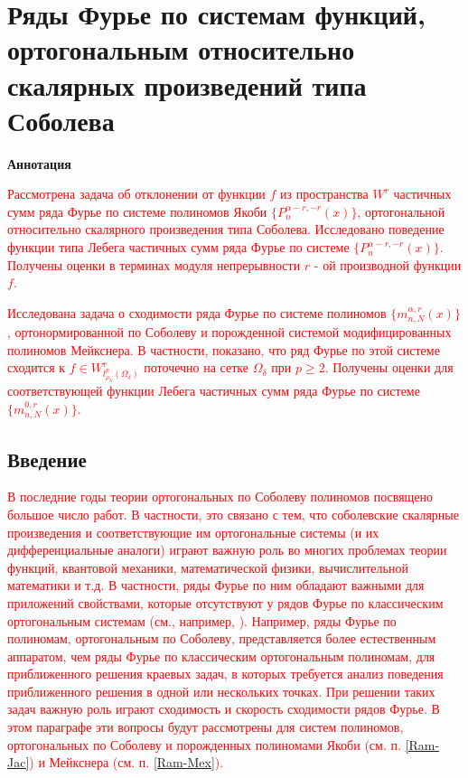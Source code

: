 \chapter{Ряды Фурье по системам функций, ортогональным относительно скалярных произведений типа Соболева}

\begin{center}
\textbf{ Аннотация}
\end{center}
\textcolor{red}{Рассмотрена задача об отклонении от функции $f$ из пространства $W^r$ частичных сумм ряда Фурье по системе полиномов Якоби $\{P_n^{\alpha-r,-r}(x)\}$, ортогональной относительно скалярного произведения типа Соболева. Исследовано поведение функции типа Лебега частичных сумм ряда Фурье по системе $\{P_n^{\alpha-r,-r}(x)\}$. Получены оценки в терминах модуля непрерывности $r$ - ой производной функции $f$.}

\textcolor{red}{Исследована задача о сходимости ряда Фурье по системе полиномов $\{m_{n,N}^{\alpha,r}(x)\}$, ортонормированной по Соболеву и порожденной системой модифицированных полиномов Мейкснера. В частности, показано, что ряд Фурье по этой системе сходится к $f\in W^r_{l^p_{\rho_N}(\Omega_\delta)}$ поточечно на сетке $\Omega_\delta$ при $p\ge2$. Получены оценки для соответствующей функции Лебега частичных сумм ряда Фурье по системе $\{m_{n,N}^{0,r}(x)\}$.}


\section*{Введение}

\textcolor{red}{В последние годы теории ортогональных по Соболеву полиномов посвящено большое число работ. В частности, это связано с тем, что соболевские скалярные произведения и соответствующие им ортогональные системы (и их дифференциальные аналоги) играют важную роль во многих проблемах теории функций, квантовой механики, математической физики, вычислительной математики и т.д. В частности, ряды Фурье по ним обладают важными для приложений свойствами, которые отсутствуют у рядов Фурье по классическим ортогональным системам (см., например, \cite{Ram-Ba-Ra-Pe,Ram-Mar-Xu,Ram-Shar-UMN}).
Например, ряды Фурье по полиномам, ортогональным по Соболеву, представляется более естественным аппаратом, чем ряды Фурье по классическим ортогональным полиномам, для приближенного решения краевых задач, в которых требуется анализ поведения приближенного решения в одной или нескольких точках.
При решении таких задач важную роль играют сходимость и скорость сходимости рядов Фурье. В этом параграфе эти вопросы будут рассмотрены для систем полиномов, ортогональных по Соболеву и порожденных полиномами Якоби (см. п. \ref{Ram-Jac}) и Мейкснера (см. п. \ref{Ram-Mex}).}

